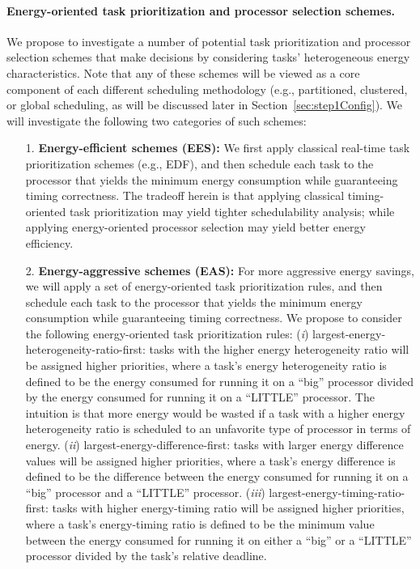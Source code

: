 \vspace{-1mm}
\paragraph{Energy-oriented task prioritization and processor selection schemes.} We propose to investigate a number of potential task prioritization and processor selection schemes that make decisions by considering tasks' heterogeneous energy characteristics. Note that any of these schemes will be viewed as a core component of each different scheduling methodology (e.g., partitioned, clustered, or global scheduling, as will be discussed later in Section~\ref{sec:step1Config}). We will investigate the following two categories of such schemes:

\begin{itemize}
\item[1.] \textbf{Energy-efficient schemes (EES):} We first apply classical real-time task prioritization schemes (e.g., EDF), and then schedule each task to the processor that yields the minimum energy consumption while guaranteeing timing correctness. The tradeoff herein is that applying classical timing-oriented task prioritization may yield tighter schedulability analysis; while applying energy-oriented processor selection may yield better energy efficiency.
\item[2.] \textbf{Energy-aggressive schemes (EAS):} For more aggressive energy savings, we will apply a set of energy-oriented task prioritization rules, and then schedule each task to the processor that yields the minimum energy consumption while guaranteeing timing correctness. We propose to consider the following energy-oriented task prioritization rules: (\textit{i}) largest-energy-heterogeneity-ratio-first: tasks with the higher energy heterogeneity ratio will be assigned higher priorities, where a task's energy heterogeneity ratio is defined to be  the energy consumed for running it on a ``big'' processor divided by the energy consumed for running it on a ``LITTLE'' processor. The intuition is that more energy would be wasted if a task with a higher energy heterogeneity ratio is scheduled to an unfavorite type of processor in terms of energy. (\textit{ii}) largest-energy-difference-first: tasks with larger energy difference values will be assigned higher priorities, where a task's energy difference is defined to be the difference between the energy consumed for running it on a ``big'' processor and a ``LITTLE'' processor. (\textit{iii}) largest-energy-timing-ratio-first: tasks with higher energy-timing ratio will be assigned higher priorities, where a task's energy-timing ratio is defined to be the minimum value between the energy consumed for running it on either a ``big'' or a ``LITTLE'' processor divided by the task's relative deadline.
\end{itemize}

